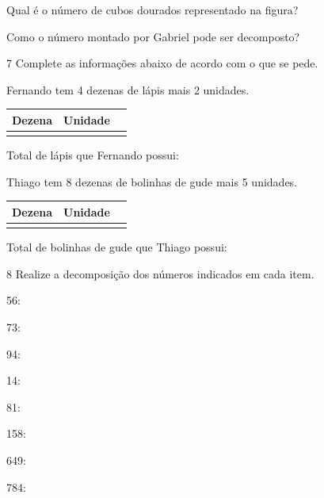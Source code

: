 \item Qual é o número de cubos dourados representado na figura?


\item Como o número montado por Gabriel pode ser decomposto?


\num{7} Complete as informações abaixo de acordo com o que se pede. 

\begin{escolha}

\item
  Fernando tem 4 dezenas de lápis mais 2 unidades.

\begin{longtable}[]{@{}lll@{}}
\toprule
Dezena & Unidade\tabularnewline
\midrule
\endhead
&\tabularnewline
\bottomrule
\end{longtable}

Total de lápis que Fernando possui:

\item Thiago tem 8 dezenas de bolinhas de gude mais 5 unidades.

\begin{longtable}[]{@{}lll@{}}
\toprule
Dezena & Unidade\tabularnewline
\midrule
\endhead
&\tabularnewline
\bottomrule
\end{longtable}

Total de bolinhas de gude que Thiago possui:
\end{escolha}

\num{8} Realize a decomposição dos números indicados em cada item.

\begin{escolha}
\item 56: 

\item 73: 

\item 94: 

\item 14: 

\item 81: 

\item 158: 

\item 649: 

\item 784: 
\end{escolha}


